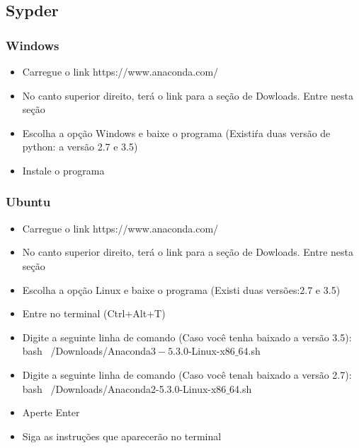 \subsection{Sypder}


\subsubsection{Windows}
\begin{itemize}
    \item Carregue o link https://www.anaconda.com/
    \item No canto superior direito, terá o link para a seção de Dowloads. Entre nesta seção
    \item Escolha a opção Windows e baixe o programa (Existiŕa duas versão de python: a versão 2.7 e 3.5)
    \item Instale o programa
\end{itemize}


\subsubsection{Ubuntu}
\begin{itemize}
    \item Carregue o link https://www.anaconda.com/
    \item No canto superior direito, terá o link para a seção de Dowloads. Entre nesta seção
    \item Escolha a opção Linux e baixe o programa (Existi duas versões:2.7 e 3.5)
    \item Entre no terminal (Ctrl+Alt+T)
    \item Digite a seguinte linha de comando (Caso você tenha baixado a versão 3.5): 
    bash ~/Downloads/Anaconda$3-5.3.0$-Linux-x86$\_$64.sh 
    \item Digite a seguinte linha de comando (Caso você tenah baixado a versão 2.7):
    bash ~/Downloads/Anaconda2-5.3.0-Linux-x86$\_$64.sh
    \item Aperte Enter
    \item Siga as instruções que aparecerão no terminal
\end{itemize}